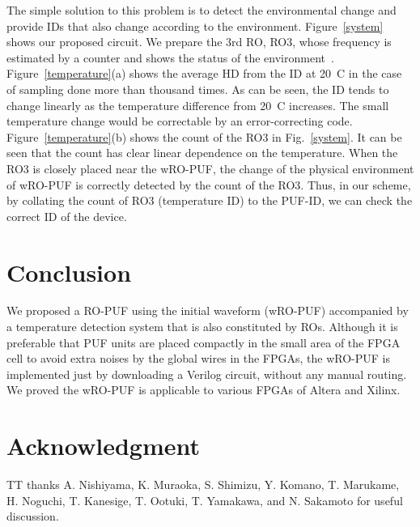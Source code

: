 ﻿\documentclass[aps,preprint,prb,superscriptaddress,amsmath,showpacs,tightenlines]{revtex4}
\begin{document}
The simple solution to this problem is to detect the environmental change and provide 
IDs that also change according to the environment.
Figure~\ref{system} shows our proposed circuit.
We prepare the 3rd RO, RO3, whose frequency is estimated by 
a counter and shows the status of the environment~\cite{Sayed}.
Figure~\ref{temperature}(a) shows the average HD from the ID 
at 20~C in the case of sampling done more than thousand times. 
As can be seen, 
the ID tends to change linearly as the temperature difference 
from 20~C increases.
The small temperature change would be correctable by an error-correcting code. 
Figure~\ref{temperature}(b) shows  the count of the RO3 in Fig.~\ref{system}. 
It can be seen that the count has clear linear dependence on the temperature. 
When the RO3 is closely placed 
near the wRO-PUF, the change of the physical 
environment of wRO-PUF is correctly 
detected by the count of the RO3. Thus, in our scheme, 
by collating the count of RO3 (temperature ID) to the PUF-ID, 
we can check the correct ID of the device.


\section{Conclusion}
We proposed a RO-PUF using 
the initial waveform (wRO-PUF) accompanied by 
a temperature detection system that 
is also constituted by ROs.
Although it is preferable that PUF units are placed compactly in the 
 small area of the FPGA cell to avoid 
extra noises by the global wires in the FPGAs,
the wRO-PUF is implemented just by 
downloading a Verilog circuit, without any manual routing.
We proved the wRO-PUF is applicable to various FPGAs
of Altera and Xilinx. 

 

\section*{Acknowledgment}
TT thanks A. Nishiyama, K. Muraoka, S. Shimizu, 
Y. Komano, T. Marukame, H. Noguchi, T. Kanesige, T. Ootuki,
T. Yamakawa, and N. Sakamoto for useful discussion.
\end{document}
